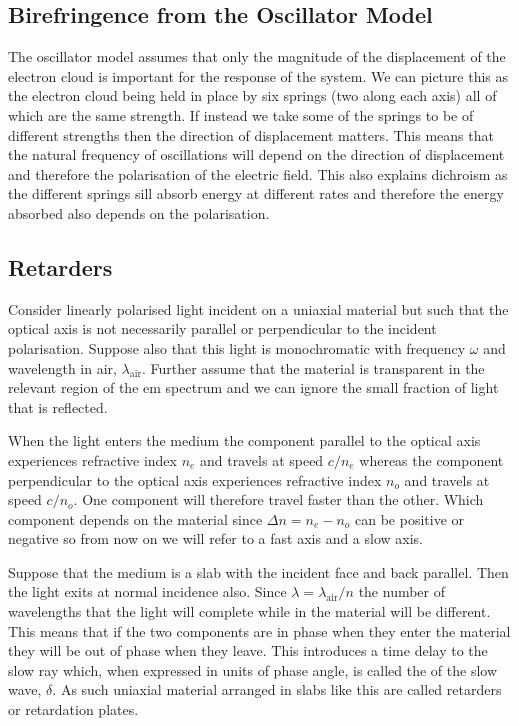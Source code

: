     \subsection{Birefringence from the Oscillator Model}
    The oscillator model assumes that only the magnitude of the displacement of the electron cloud is important for the response of the system.
    We can picture this as the electron cloud being held in place by six springs (two along each axis) all of which are the same strength.
    If instead we take some of the springs to be of different strengths then the direction of displacement matters.
    This means that the natural frequency of oscillations will depend on the direction of displacement and therefore the polarisation of the electric field.
    This also explains dichroism as the different springs sill absorb energy at different rates and therefore the energy absorbed also depends on the polarisation.
    
    \subsection{Retarders}
    Consider linearly polarised light incident on a uniaxial material but such that the optical axis is not necessarily parallel or perpendicular to the incident polarisation.
    Suppose also that this light is monochromatic with frequency \(\omega\) and wavelength in air, \(\lambda_{\mathrm{air}}\).
    Further assume that the material is transparent in the relevant region of the \gls{em} spectrum and we can ignore the small fraction of light that is reflected.
    
    When the light enters the medium the component parallel to the optical axis experiences refractive index \(n_e\) and travels at speed \(c/n_e\) whereas the component perpendicular to the optical axis experiences refractive index \(n_o\) and travels at speed \(c/n_o\).
    One component will therefore travel faster than the other.
    Which component depends on the material since \(\Delta n = n_e - n_o\) can be positive or negative so from now on we will refer to a fast axis and a slow axis.
    
    Suppose that the medium is a slab with the incident face and back parallel.
    Then the light exits at normal incidence also.
    Since \(\lambda = \lambda_{\mathrm{air}}/n\) the number of wavelengths that the light will complete while in the material will be different.
    This means that if the two components are in phase when they enter the material they will be out of phase when they leave.
    This introduces a time delay to the slow ray which, when expressed in units of phase angle, is called the  of the slow wave, \(\delta\).
    As such uniaxial material arranged in slabs like this are called retarders or retardation plates.
    
